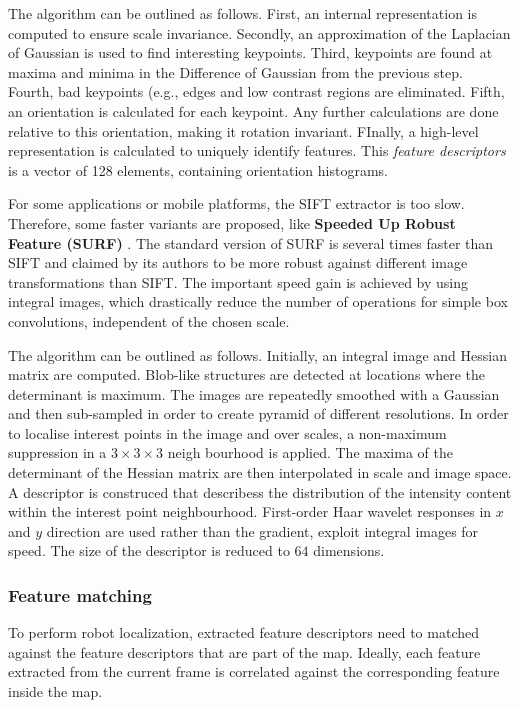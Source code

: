 {The algorithm can be outlined as follows.
First, an internal representation is computed to ensure scale invariance.
Secondly, an approximation of the Laplacian of Gaussian is used to find interesting keypoints.
Third, keypoints are found at maxima and minima in the Difference of Gaussian from the previous step.
Fourth, bad keypoints (e.g., edges and low contrast regions are eliminated.
Fifth, an orientation is calculated for each keypoint.
Any further calculations are done relative to this orientation, making it rotation invariant.
FInally, a high-level representation is calculated to uniquely identify features.
This \textit{feature descriptors} is a vector of 128 elements, containing orientation histograms.

For some applications or mobile platforms, the SIFT extractor is too slow.
Therefore, some faster variants are proposed, like \textbf{Speeded Up Robust Feature (SURF)} \cite{Bay2008cviu}.
The standard version of SURF is several times faster than SIFT and claimed by its authors to be more robust against different image transformations than SIFT.
The important speed gain is achieved by using integral images, which drastically reduce the number of operations for simple box convolutions, independent of the chosen scale.

The algorithm can be outlined as follows.
Initially, an integral image and  Hessian matrix are computed.
Blob-like structures are detected at locations where the determinant is maximum.
The images are repeatedly smoothed with a Gaussian and then sub-sampled in order to create pyramid of different resolutions.
In order to localise interest points in the image and over scales, a non-maximum suppression in a $3 \times 3 \times 3$ neigh bourhood is applied. 
The maxima of the determinant of the Hessian matrix are then interpolated in scale and image space.
A descriptor is construced that describess the distribution of the intensity content within the interest point neighbourhood.
First-order Haar wavelet responses in $x$ and $y$ direction are used rather than the gradient, exploit integral images for speed. The size of the descriptor is reduced to $64$ dimensions.

\subsubsection{Feature matching}
\label{sec:theory_feature_matching}
To perform robot localization, extracted feature descriptors need to matched against the feature descriptors that are part of the map.
Ideally, each feature extracted from the current frame is correlated against the corresponding feature inside the map.

}
